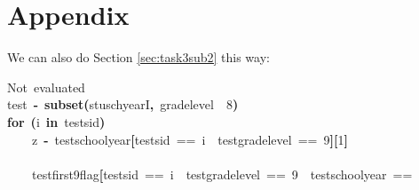 \documentclass[12pt]{article}
\makeatletter
\newcommand{\hlnumber}[1]{\textcolor[rgb]{0,0,0}{#1}}%
\newcommand{\hlfunctioncall}[1]{\textcolor[rgb]{0.501960784313725,0,0.329411764705882}{\textbf{#1}}}%
\newcommand{\hlkeyword}[1]{\textcolor[rgb]{0,0,0}{\textbf{#1}}}%
\newcommand{\hlcomment}[1]{\textcolor[rgb]{0.180392156862745,0.6,0.341176470588235}{#1}}%
\newcommand{\hlassignement}[1]{\textcolor[rgb]{0,0,0}{\textbf{#1}}}%
\newcommand{\hlsymbol}[1]{\textcolor[rgb]{0,0,0}{#1}}%
\newcommand{\hlstd}[1]{\textcolor[rgb]{0,0,0}{#1}}%
\newenvironment{kframe}{%
 \def\FrameCommand##1{\hskip\@totalleftmargin \hskip-\fboxsep
 \colorbox{shadecolor}{##1}\hskip-\fboxsep
     \hskip-\linewidth \hskip-\@totalleftmargin \hskip\columnwidth}%
 \MakeFramed {\advance\hsize-\width
   \@totalleftmargin\z@ \linewidth\hsize
   \@setminipage}}%
 {\par\unskip\endMakeFramed}
\newenvironment{knitrout}{}{} %
\renewenvironment{knitrout}{\begin{footnotesize}}{\end{footnotesize}}
\makeatother
\begin{document}
\section{Appendix}
We can also do Section \ref{sec:task3sub2} this way:
\begin{knitrout}
\color{fgcolor}\begin{kframe}
\begin{flushleft}
\ttfamily\noindent
\hlcomment{\usebox{\hlnormalsizeboxhash}{\ }Not{\ }evaluated}\hspace*{\fill}\\
\hlstd{}\hlsymbol{test}{\ }\hlassignement{\usebox{\hlnormalsizeboxlessthan}-}{\ }\hlfunctioncall{subset}\hlkeyword{(}\hlsymbol{stuschyearI}\hlkeyword{,}{\ }\hlsymbol{grade\usebox{\hlnormalsizeboxunderscore}level}{\ }\hlkeyword{\usebox{\hlnormalsizeboxgreaterthan}}{\ }\hlnumber{8}\hlkeyword{)}\hspace*{\fill}\\
\hlstd{}\hlkeyword{for}{\ }\hlkeyword{(}\hlsymbol{i}{\ }\hlkeyword{in}{\ }\hlsymbol{test}\hlkeyword{\usebox{\hlnormalsizeboxdollar}}\hlsymbol{sid}\hlkeyword{)}{\ }\hlkeyword{\usebox{\hlnormalsizeboxopenbrace}}\hspace*{\fill}\\
\hlstd{}{\ }{\ }{\ }{\ }\hlsymbol{z}{\ }\hlassignement{\usebox{\hlnormalsizeboxlessthan}-}{\ }\hlsymbol{test}\hlkeyword{\usebox{\hlnormalsizeboxdollar}}\hlsymbol{school\usebox{\hlnormalsizeboxunderscore}year}\hlkeyword{[}\hlsymbol{test}\hlkeyword{\usebox{\hlnormalsizeboxdollar}}\hlsymbol{sid}{\ }=={\ }\hlsymbol{i}{\ }\hlkeyword{\usebox{\hlnormalsizeboxand}}{\ }\hlsymbol{test}\hlkeyword{\usebox{\hlnormalsizeboxdollar}}\hlsymbol{grade\usebox{\hlnormalsizeboxunderscore}level}{\ }=={\ }\hlnumber{9}\hlkeyword{]}\hlkeyword{[}\hlnumber{1}\hlkeyword{]}\hspace*{\fill}\\
\hlstd{}\hspace*{\fill}\\
\hlstd{}{\ }{\ }{\ }{\ }\hlsymbol{test}\hlkeyword{\usebox{\hlnormalsizeboxdollar}}\hlsymbol{first9\usebox{\hlnormalsizeboxunderscore}flag}\hlkeyword{[}\hlsymbol{test}\hlkeyword{\usebox{\hlnormalsizeboxdollar}}\hlsymbol{sid}{\ }=={\ }\hlsymbol{i}{\ }\hlkeyword{\usebox{\hlnormalsizeboxand}}{\ }\hlsymbol{test}\hlkeyword{\usebox{\hlnormalsizeboxdollar}}\hlsymbol{grade\usebox{\hlnormalsizeboxunderscore}level}{\ }=={\ }\hlnumber{9}{\ }\hlkeyword{\usebox{\hlnormalsizeboxand}}{\ }\hlsymbol{test}\hlkeyword{\usebox{\hlnormalsizeboxdollar}}\hlsymbol{school\usebox{\hlnormalsizeboxunderscore}year}{\ }==\hspace*{\fill}\\

\end{flushleft}
\end{kframe}
\end{knitrout}
\end{document}
